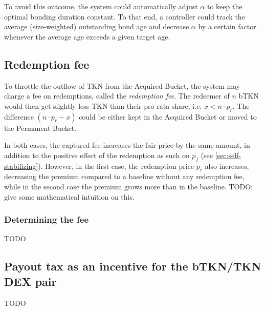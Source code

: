 \documentclass{article}
\begin{document}
To avoid this outcome, the system could automatically adjust $\alpha$ to keep the optimal bonding duration constant. To that end, a controller could track the average (size-weighted) outstanding bond age and decrease $\alpha$ by a certain factor whenever the average age exceeds a given target age.

\subsection{Redemption fee}
  \label{sec:redemption-fee}
To throttle the outflow of TKN from the Acquired Bucket, the system may charge a fee on redemptions, called the \textit{redemption fee}. The redeemer of $n$ bTKN would then get slightly less TKN than their pro rata share, i.e. $x < n \cdot p_r$. The difference $(n \cdot p_r - x)$ could be either kept in the Acquired Bucket or moved to the Permanent Bucket. 

In both cases, the captured fee increases the fair price by the same amount, in addition to the positive effect of the redemption as such on $p_f$ (see \ref{sec:self-stabilizing}). However, in the first case, the redemption price $p_r$ also increases, decreasing the premium compared to a baseline without any redemption fee, while in the second case the premium grows more than in the baseline. TODO: give some mathematical intuition on this.

\subsubsection{Determining the fee}
TODO

\subsection{Payout tax as an incentive for the bTKN/TKN DEX pair}
  \label{sec:payout-tax}
TODO
\end{document}
